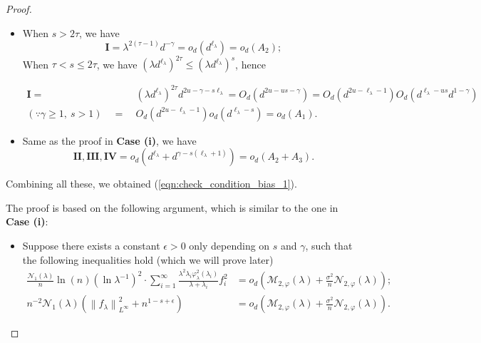 \documentclass{article}
\theoremstyle{plain}
\theoremstyle{definition}
\theoremstyle{remark}
\newcommand{\calN}{\mathcal{N}}
\newcommand{\reg}{\varphi_\lambda}
\newcommand{\green}{\color{green}}
\begin{document}
\begin{appendix}
\begin{proof}
\begin{itemize}
    \item When $s >2\tau$, we have
    $$
        \mathbf{I}=\lambda^{2(\tau-1)} d^{-\gamma} {=} o_d( d^{\ell_{\lambda}})=o_d(A_2);
    $$
    When $\tau < s \leq 2\tau$, we have $(\lambda d^{\ell_{\lambda}})^{2\tau} \leq (\lambda d^{\ell_{\lambda}})^{s}$, hence
    
    \begin{equation*}
        \begin{aligned}
            \mathbf{I} =&~ (\lambda d^{\ell_{\lambda}})^{2\tau} d^{2u-\gamma -s\ell_{\lambda}} = O_d(d^{2u-us-\gamma}) = O_d(d^{2u-\ell_{\lambda}-1})O_d(d^{\ell_{\lambda}-us}d^{1-\gamma})\\ (\because \gamma \geq 1,~ s> 1) \quad = &~ O_d(d^{2u-\ell_{\lambda}-1}) o_d(d^{\ell_{\lambda}-s})=o_d(A_1).
        \end{aligned}
    \end{equation*}



    
    \item Same as the proof in {\bf Case (i)}, we have
    $$
    \mathbf{II}, \mathbf{III}, \mathbf{IV} = o_d(d^{\ell_{\lambda}} + d^{\gamma-s(\ell_{\lambda}+1)} ) = o_d(A_2 + A_3).
    $$
\end{itemize}
Combining all these, we obtained (\ref{eqn:check_condition_bias_1}).



The proof is based on the following  argument, which is similar to the one in {\bf Case (i)}:  
    \begin{itemize}
        \item []
        
        Suppose there exists a constant $\epsilon>0$ only depending on $s$ and $\gamma$, such that the following inequalities hold (which we will prove later)
\begin{equation}\label{eqn:check_condition_bias_3}
      \begin{aligned}
   \frac{\mathcal{N}_{1}(\lambda)}{n} \ln(n) (\ln\lambda^{-1})^2 \cdot \sum_{i=1}^\infty \frac{\lambda^2 \lambda_i \reg^2(\lambda_i)}{\lambda + \lambda_i} f_i^2  
    &= o_{d} 
    \left( \mathcal{M}_{2, \varphi}(\lambda) + \frac{\sigma^2}{n} \calN_{2,\varphi}(\lambda)  \right);\\
    n^{-2} \mathcal{N}_{1}(\lambda) 
    \left(
    \left\| f_{\lambda} \right\|_{L^{\infty}}^2  
    +
    n^{1-s+\epsilon}
    \right)
    &= o_{d}\left( \mathcal{M}_{2, \varphi}(\lambda) + \frac{\sigma^2}{n} \calN_{2,\varphi}(\lambda)  \right).
      \end{aligned}
  \end{equation}
  

\end{itemize}
\end{proof}
\end{appendix}
\end{document}
